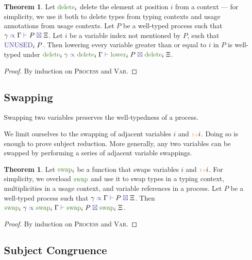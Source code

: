\documentclass[a4paper,UKenglish,cleveref,autoref,thm-restate,authorcolumns]{lipics-v2019}
\theoremstyle{definition}
\newtheorem{nitheorem}[theorem]{Theorem}
\newcommand{\type}[1]{\textcolor{BlueViolet}{\operatorname{#1}}}
\newcommand{\constr}[1]{\textcolor{BurntOrange}{\operatorname{#1}}}
\newcommand{\func}[1]{\textcolor{OliveGreen}{\operatorname{#1}}}
\newcommand{\suc}{\constr{\scriptstyle 1+}}
\newcommand{\types}[4]{#1 \; \type{\propto} \; #2 \; \type{\vdash} \; #3 \; \type{\boxtimes} \; #4}
\newcommand{\Unused}{\type{UNUSED}}
\begin{document}
\begin{nitheorem}
  \label{thm:strengthening}
  Let $\func{delete}_i$ delete the element at position $i$ from a context --- for simplicity, we use it both to delete types from typing contexts and usage annotations from usage contexts.
  Let $P$ be a well-typed process such that $\types{\gamma}{\Gamma}{P}{\Xi}$.
  Let $i$ be a variable index not mentioned by $P$, such that $\Unused_i \; P$.
  Then lowering every variable greater than or equal to $i$ in $P$ is well-typed under $\types{\func{delete}_i \; \gamma}{\func{delete}_i \; \Gamma}{\func{lower}_i \; P}{\func{delete}_i \; \Xi}$.
\end{nitheorem}
\begin{proof}
  By induction on \textsc{Process} and \textsc{Var}.
\end{proof}

\subsection{Swapping}
\label{swapping}

Swapping two variables preserves the well-typedness of a process.

\begin{remark}
  We limit ourselves to the swapping of adjacent variables $i$ and $\suc i$.
  Doing so is enough to prove subject reduction.
  More generally, any two variables can be swapped by performing a series of adjacent variable swappings.
\end{remark}

\begin{nitheorem}
  \label{thm:swapping}
  Let $\func{swap}_i$ be a function that swaps variables $i$ and $\suc i$.
  For simplicity, we overload $\func{swap}$ and use it to swap types in a typing context, multiplicities in a usage context, and variable references in a process.
  \todo{}
  Let $P$ be a well-typed process such that $\types{\gamma}{\Gamma}{P}{\Xi}$.
  Then $\types{\func{swap}_i \; \gamma}{\func{swap}_i \; \Gamma}{\func{swap}_i \; P}{\func{swap}_i \; \Xi}$.
\end{nitheorem}
\begin{proof}
  By induction on \textsc{Process} and \textsc{Var}.
\end{proof}

\subsection{Subject Congruence}
\label{subject-congruence}
\end{document}
